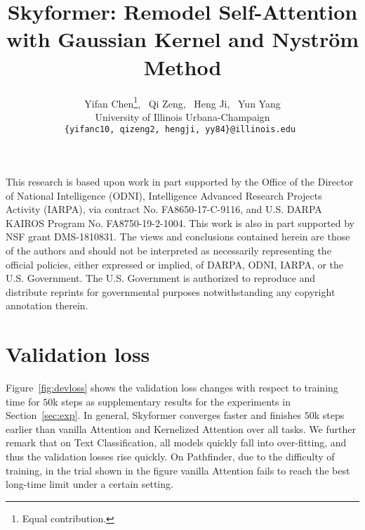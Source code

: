 \documentclass{article}
\title{Skyformer: Remodel Self-Attention with Gaussian Kernel and Nystr\"om Method}
\author{
Yifan Chen\thanks{\; Equal contribution. },~   
Qi Zeng\footnotemark[1],~ 
Heng Ji,~ 
Yun Yang \\ 
University of Illinois Urbana-Champaign \\
\texttt{\{yifanc10, qizeng2,  hengji, yy84\}@illinois.edu }
}
\begin{document}
\maketitle


\begin{abstract}

\end{abstract}











\begin{ack}

This research is based upon work in part supported by the Office of the Director of National Intelligence (ODNI), Intelligence Advanced Research Projects Activity (IARPA), via contract No. FA8650-17-C-9116, and U.S. DARPA KAIROS Program No. FA8750-19-2-1004. This work is also in part supported by NSF grant DMS-1810831. The views and conclusions contained herein are those of the authors and should not be interpreted as necessarily representing the official policies, either expressed or implied, of DARPA, ODNI, IARPA, or the U.S. Government. The U.S. Government is authorized to reproduce and distribute reprints for governmental purposes notwithstanding any copyright annotation therein.


\end{ack}

\clearpage


\clearpage
\appendix

\section{Validation loss}
\label{sec:dev_loss}


Figure~\ref{fig:devloss} shows the validation loss changes with respect to training time for $50$k steps as supplementary results for the experiments in Section~\ref{sec:exp}.
In general, Skyformer converges faster and finishes $50$k steps earlier than vanilla Attention and Kernelized Attention over all tasks.
We further remark that on Text Classification, all models quickly fall into over-fitting, and thus the validation losses rise quickly.
On Pathfinder, due to the difficulty of training, in the trial shown in the figure vanilla Attention fails to reach the best long-time limit under a certain setting.
\end{document}
